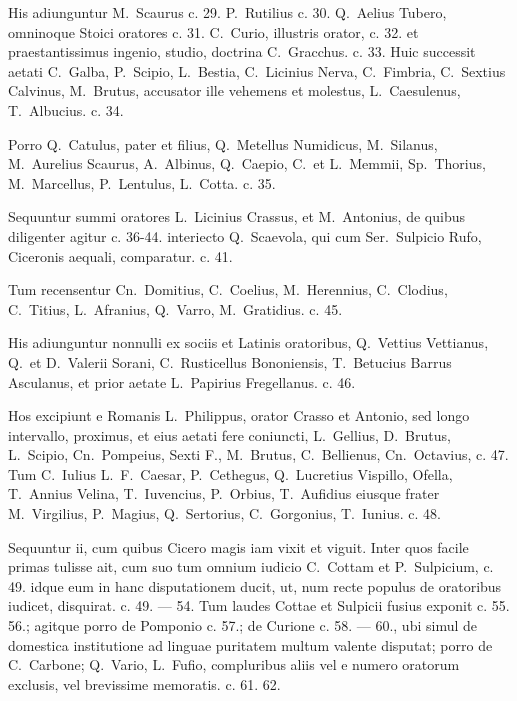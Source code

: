 His adiunguntur M.~Scaurus c. 29. P.~Rutilius c. 30. Q.~Aelius Tubero, omninoque Stoici oratores c. 31. C.~Curio, illustris orator, c. 32. et praestantissimus ingenio, studio, doctrina C.~Gracchus. c. 33. Huic successit aetati C.~Galba, P.~Scipio, L.~Bestia, C.~Licinius Nerva, C.~Fimbria, C.~Sextius Calvinus, M.~Brutus, accusator ille vehemens et molestus, L.~Caesulenus, T.~Albucius. c. 34.

Porro Q.~Catulus, pater et filius, Q.~Metellus Numidicus, M.~Silanus, M.~Aurelius Scaurus, A.~Albinus, Q.~Caepio, C.\ et L.~Memmii, Sp.~Thorius, M.~Marcellus, P.~Lentulus, L.~Cotta. c. 35.

Sequuntur summi oratores L.~Licinius Crassus, et M.~Antonius, de quibus diligenter agitur c. 36-44. interiecto Q.~Scaevola, qui cum Ser.~Sulpicio Rufo, Ciceronis aequali, comparatur. c. 41.

Tum recensentur Cn.~Domitius, C.~Coelius, M.~Herennius, C.~Clodius, C.~Titius, L.~Afranius, Q.~Varro, M.~Gratidius. c. 45.

His adiunguntur nonnulli ex sociis et Latinis oratoribus, Q.~Vettius Vettianus, Q.\ et D.~Valerii Sorani, C.~Rusticellus Bononiensis, T.~Betucius Barrus Asculanus, et prior aetate L.~Papirius Fregellanus. c. 46.

Hos excipiunt e Romanis L.~Philippus, orator Crasso et Antonio, sed longo intervallo, proximus, et eius aetati fere coniuncti, L.~Gellius, D.~Brutus, L.~Scipio, Cn.~Pompeius, Sexti F., M.~Brutus, C.~Bellienus, Cn.~Octavius, c. 47. Tum C.~Iulius L.~F.\ Caesar, P.~Cethegus, Q.~Lucretius Vispillo, Ofella, T.~Annius Velina, T.~Iuvencius, P.~Orbius, T.~Aufidius eiusque frater M.~Virgilius, P.~Magius, Q.~Sertorius, C.~Gorgonius, T.~Iunius. c. 48.

Sequuntur ii, cum quibus Cicero magis iam vixit et viguit. Inter quos facile primas tulisse ait, cum suo tum omnium iudicio C.~Cottam et P.~Sulpicium, c. 49. idque eum in hanc disputationem ducit, ut, num recte populus de oratoribus iudicet, disquirat. c. 49. — 54. Tum laudes Cottae et Sulpicii fusius exponit c. 55. 56.; agitque porro de Pomponio c. 57.; de Curione c. 58. — 60., ubi simul de domestica institutione ad linguae puritatem multum valente disputat; porro de C.~Carbone; Q.~Vario, L.~Fufio, compluribus aliis vel e numero oratorum exclusis, vel brevissime memoratis. c. 61. 62.

